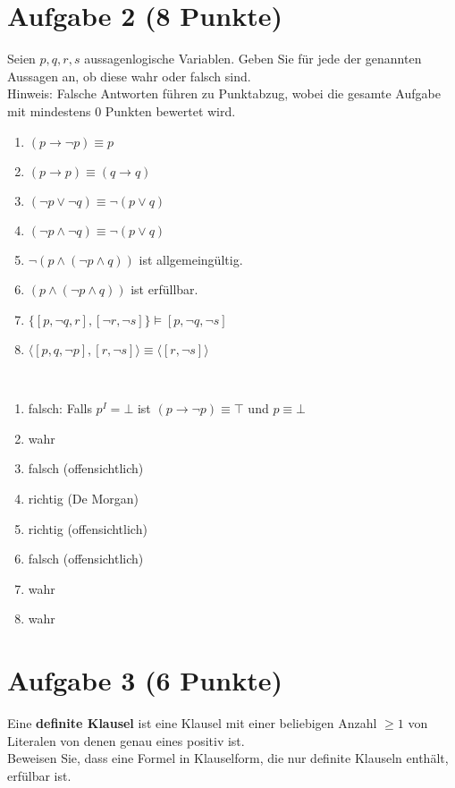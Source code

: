 \documentclass[12pt,a4paper]{article}
\begin{document}
\section*{Aufgabe 2 (8 Punkte)}
Seien $p,q,r,s$ aussagenlogische Variablen. Geben Sie für jede der genannten Aussagen an, ob diese wahr oder falsch sind.\\

Hinweis: Falsche Antworten führen zu Punktabzug, wobei die gesamte Aufgabe mit mindestens 0 Punkten bewertet wird.

\begin{enumerate}[label=\alph*)]
\item $(p\to\neg p)\equiv p$
\item $(p\to p)\equiv(q\to q)$
\item $(\neg p\vee\neg q)\equiv \neg(p\vee q)$
\item $(\neg p\wedge\neg q)\equiv \neg(p\vee q)$
\item $\neg(p\wedge(\neg p\wedge q))$ ist allgemeingültig.
\item $(p\wedge(\neg p\wedge q))$ ist erfüllbar.
\item $\big\lbrace[p,\neg q,r],[\neg r,\neg s]\big\rbrace\models[p,\neg q,\neg s]$
\item $\big\langle[p,q,\neg p],[r,\neg s]\big\rangle\equiv\big\langle[r,\neg s]\big\rangle$
\end{enumerate}
\begin{lösung}\
\begin{enumerate}[label=\alph*)]
\item falsch: Falls $p^I=\bot$ ist $(p\to\neg p)\equiv\top$ und $p\equiv\bot$
\item wahr
\item falsch (offensichtlich)
\item richtig (De Morgan)
\item richtig (offensichtlich)
\item falsch (offensichtlich)
\item wahr
\item wahr
\end{enumerate}
\end{lösung}

\section*{Aufgabe 3 (6 Punkte)}
Eine \textbf{definite Klausel} ist eine Klausel mit einer beliebigen Anzahl $\geq1$ von Literalen von denen genau eines positiv ist.\\
Beweisen Sie, dass eine Formel in Klauselform, die nur definite Klauseln enthält, erfülbar ist.
\end{document}
